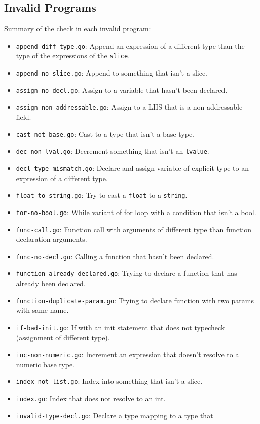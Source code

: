 \documentclass[11pt]{article}
\begin{document}
\subsection{Invalid Programs}
\label{sec:org8c0b191}
Summary of the check in each invalid program:
\begin{itemize}
\item \texttt{append-diff-type.go}: Append an expression of a different type than
the type of the expressions of the \texttt{slice}.
\item \texttt{append-no-slice.go}: Append to something that isn't a slice.
\item \texttt{assign-no-decl.go}: Assign to a variable that hasn't been declared.
\item \texttt{assign-non-addressable.go}: Assign to a LHS that is a
non-addressable field.
\item \texttt{cast-not-base.go}: Cast to a type that isn't a base type.
\item \texttt{dec-non-lval.go}: Decrement something that isn't an \texttt{lvalue}.
\item \texttt{decl-type-mismatch.go}: Declare and assign variable of explicit type
to an expression of a different type.
\item \texttt{float-to-string.go}: Try to cast a \texttt{float} to a \texttt{string}.
\item \texttt{for-no-bool.go}: While variant of for loop with a condition that isn't
a bool.
\item \texttt{func-call.go}: Function call with arguments of different type than
function declaration arguments.
\item \texttt{func-no-decl.go}: Calling a function that hasn't been declared.
\item \texttt{function-already-declared.go}: Trying to declare a function that
has already been declared.
\item \texttt{function-duplicate-param.go}: Trying to declare function with two
params with same name.
\item \texttt{if-bad-init.go}: If with an init statement that does not typecheck
(assignment of different type).
\item \texttt{inc-non-numeric.go}: Increment an expression that doesn't resolve
to a numeric base type.
\item \texttt{index-not-list.go}: Index into something that isn't a slice.
\item \texttt{index.go}: Index that does not resolve to an int.
\item \texttt{invalid-type-decl.go}: Declare a type mapping to a type that

\end{itemize}
\end{document}
